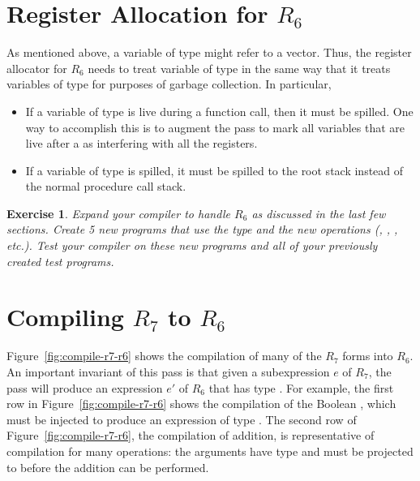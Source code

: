 \documentclass[11pt]{book}
\newtheorem{exercise}[theorem]{Exercise}
\begin{document}
\section{Register Allocation for $R_6$}
\label{sec:register-allocation-r6}

As mentioned above, a variable of type  might refer to a
vector. Thus, the register allocator for $R_6$ needs to treat variable
of type  in the same way that it treats variables of type
 for purposes of garbage collection. In particular,
\begin{itemize}
\item If a variable of type  is live during a function call,
  then it must be spilled. One way to accomplish this is to augment
  the pass  to mark all variables that are
  live after a  as interfering with all the registers.

\item If a variable of type  is spilled, it must be spilled
  to the root stack instead of the normal procedure call stack.
\end{itemize}

\begin{exercise}\normalfont
Expand your compiler to handle $R_6$ as discussed in the last few
sections.  Create 5 new programs that use the  type and the
new operations (, , ,
etc.). Test your compiler on these new programs and all of your
previously created test programs.
\end{exercise}

\section{Compiling $R_7$ to $R_6$}
\label{sec:compile-r7}

Figure~\ref{fig:compile-r7-r6} shows the compilation of many of the
$R_7$ forms into $R_6$. An important invariant of this pass is that
given a subexpression $e$ of $R_7$, the pass will produce an
expression $e'$ of $R_6$ that has type . For example, the
first row in Figure~\ref{fig:compile-r7-r6} shows the compilation of
the Boolean , which must be injected to produce an
expression of type .
%
The second row of Figure~\ref{fig:compile-r7-r6}, the compilation of
addition, is representative of compilation for many operations: the
arguments have type  and must be projected to 
before the addition can be performed.
\end{document}
